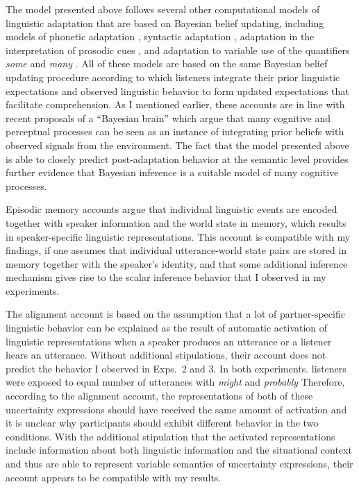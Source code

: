 The model presented above follows several other computational models of linguistic adaptation that are based 
on Bayesian belief updating, including models of phonetic adaptation \cite{Kleinschmidt2015}, syntactic 
adaptation \cite{Kleinschmidt2012}, adaptation in the interpretation of prosodic cues \cite{Roettger2019},
and adaptation to variable use of the quantifiers \textit{some} and \textit{many} \cite{Qing2014}. 
All of these models are based on the same Bayesian belief updating procedure according to which listeners integrate
their prior linguistic expectations and observed linguistic behavior to form updated expectations that facilitate comprehension.
As I mentioned earlier, these accounts are in line with recent proposals of a ``Bayesian brain'' \parencite[e.g.,][]{Clark2013,Friston2010} which argue that
many cognitive and perceptual processes can be seen as an instance of integrating prior beliefs with observed signals from the environment. The 
fact that the model presented above is able to closely predict post-adaptation behavior at the semantic level provides further evidence 
that Bayesian inference is a suitable model of many cognitive processes.

Episodic memory accounts  argue that individual linguistic 
events are encoded together with speaker information and the world state in memory, 
which results in speaker-specific linguistic representations. This account is compatible with my findings, if one assumes
that individual utterance-world state pairs are stored in memory together with the speaker's 
identity, and that some additional inference mechanism gives rise to the scalar inference
 behavior that I observed in my experiments.

The alignment account  \cite{Pickering2004} is based on the assumption that a lot of partner-specific linguistic behavior
 can be explained as the result of automatic activation of linguistic representations when 
a speaker produces an utterance or a listener hears an utterance. Without additional stipulations,
their account does not predict the behavior I observed in Exps.~2 and 3. In both experiments.
listeners were exposed to equal number of utterances with \textit{might} and \textit{probably}
Therefore, according to the alignment account, the representations of both of these uncertainty expressions
should have received the same amount of activation and it is unclear why participants should
exhibit different behavior in the two conditions. With the additional stipulation that the activated representations 
include information about both linguistic information 
and the situational context and thus are able to represent variable semantics of uncertainty expressions,
their account appears to be compatible with my results.

